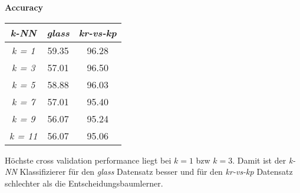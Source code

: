 
\textbf{Accuracy}

\begin{tabular}{c|c|c}
                \emph{k-NN}       & \emph{glass} & \emph{kr-vs-kp}  \\ \hline
				\emph{k = 1}  & 59.35  & 96.28  \\ \hline
				\emph{k = 3}  & 57.01  & 96.50  \\ \hline
				\emph{k = 5}  & 58.88  & 96.03  \\ \hline
				\emph{k = 7}  & 57.01  & 95.40  \\ \hline
				\emph{k = 9}  & 56.07  & 95.24  \\ \hline
				\emph{k = 11} & 56.07  & 95.06  \\ \hline
\end{tabular}

Höchste cross validation performance liegt bei $k = 1$ bzw $k = 3$. Damit ist der \emph{k-NN} Klassifizierer f\"ur den \emph{glass} Datensatz besser und f\"ur den \emph{kr-vs-kp} Datensatz schlechter als die Entscheidungsbaumlerner.



